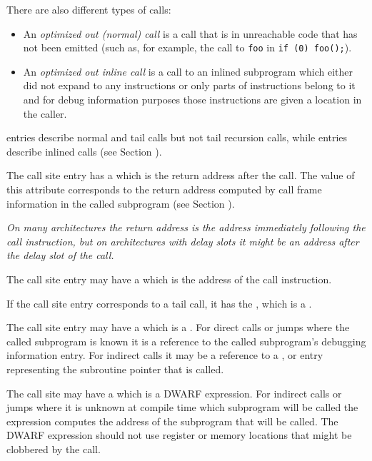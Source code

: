 There are also different types of  calls:
\begin{itemize}
\item
An \textit{optimized out (normal) call} is a call that is in unreachable code that 
has not been emitted (such as, for example, the call to \texttt{foo} in 
\texttt{if (0) foo();}).  
\item
An \textit{optimized out inline call}
is a call to an inlined subprogram which either did not expand to any instructions
or only parts of instructions belong to it and for debug information purposes those
instructions are given a location in the caller.
\end{itemize}

\DWTAGcallsite{} entries describe normal and tail calls but not tail recursion calls,
while \DWTAGinlinedsubroutine{} entries describe inlined calls 
(see Section ).

The call site entry has a 
\DWATcallreturnpcDEFN{}
which is the return address after the call.  
The value of this attribute corresponds to the return address computed by 
call frame information in the called subprogram 
(see Section ).

\textit{On many architectures the return address is the address immediately following the
call instruction, but on architectures with delay slots it might
be an address after the delay slot of the call.}

The call site entry may have a 
\DWATcallpcDEFN{}
 which is the
address of the call instruction.

If the call site entry corresponds to a tail call, it has the 
\DWATcalltailcallDEFN{}
,
which is a \CLASSflag.

The call site entry may have a 
\DWATcalloriginDEFN{}
which is a \CLASSreference.  For direct calls or jumps where the called subprogram is
known it is a reference to the called subprogram's debugging
information entry.  For indirect calls it may be a reference to a
\DWTAGvariable{}, \DWTAGformalparameter{} or \DWTAGmember{} entry representing
the subroutine pointer that is called.

The call site may have a 
\DWATcalltargetDEFN{}
 which is
a DWARF expression.  For indirect calls or jumps where it is unknown at
compile time which subprogram will be called the expression computes the
address of the subprogram that will be called.  The DWARF expression should
not use register or memory locations that might be clobbered by the call.


